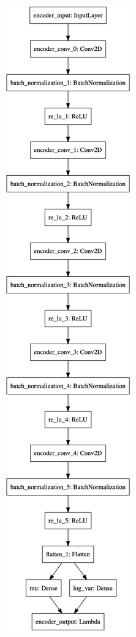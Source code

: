 \begin{figure}
    \centering
    \begin{subfigure}{.5\textwidth}
        \centering
        \includegraphics[width=\textwidth,height=.85\textheight,keepaspectratio]{images/vae/encoder.png}

\end{subfigure}
\end{figure}

